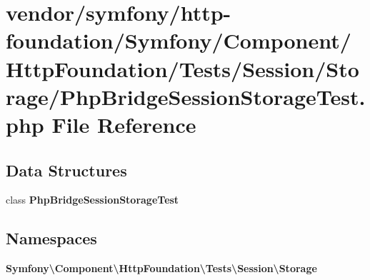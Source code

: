 \section{vendor/symfony/http-\/foundation/\+Symfony/\+Component/\+Http\+Foundation/\+Tests/\+Session/\+Storage/\+Php\+Bridge\+Session\+Storage\+Test.php File Reference}
\label{_php_bridge_session_storage_test_8php}
\subsection*{Data Structures}
\begin{DoxyCompactItemize}
\item 
class {\bf Php\+Bridge\+Session\+Storage\+Test}
\end{DoxyCompactItemize}
\subsection*{Namespaces}
\begin{DoxyCompactItemize}
\item 
 {\bf Symfony\textbackslash{}\+Component\textbackslash{}\+Http\+Foundation\textbackslash{}\+Tests\textbackslash{}\+Session\textbackslash{}\+Storage}
\end{DoxyCompactItemize}
